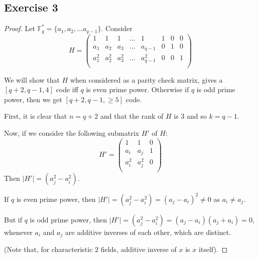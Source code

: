 \documentclass[12pt]{article}
\begin{document}
\subsection*{Exercise 3}
\begin{proof}
Let $\mathbb{F}_q^* = \{a_1, a_2, \ldots a_{q-1}\}$. Consider
$$H = \begin{pmatrix}
1 & 1 & 1 & \ldots & 1 & 1 & 0 & 0 \\
a_1 & a_2 & a_3 & \ldots & a_{q-1} & 0 & 1 & 0 \\
a_1^2 & a_2^2 & a_3^2 & \ldots & a_{q-1}^2 & 0 & 0 & 1 \\
\end{pmatrix}$$

We will show that $H$ when considered as a parity check matrix, gives a $[q+2, q-1, 4]$ code iff $q$ is even prime power. Otherwise if $q$ is odd prime power, then we get $[q+2, q-1, \geq 5]$ code.

First, it is clear that $n=q+2$ and that the rank of $H$ is $3$ and so $k = q-1$. 

Now, if we consider the following submatrix $H'$ of $H$:
$$H' = \begin{pmatrix}
1 & 1 & 0 \\
a_i & a_j & 1 \\
a_i^2 & a_j^2 & 0 \\
\end{pmatrix}$$
Then $|H'| = (a_j^2-a_i^2)$.

If $q$ is even prime power, then $|H'| = (a_j^2-a_i^2) = (a_j-a_i)^2 \neq 0$ as $a_i \neq a_j$.

But if $q$ is odd prime power, then $|H'| = (a_j^2-a_i^2) = (a_j-a_i)(a_j+a_i) = 0$, whenever $a_i$ and $a_j$ are additive inverses of each other, which are distinct.

(Note that, for characteristic $2$ fields, additive inverse of $x$ is $x$ itself).

\end{proof}

\vspace{2in} %
\end{document}
